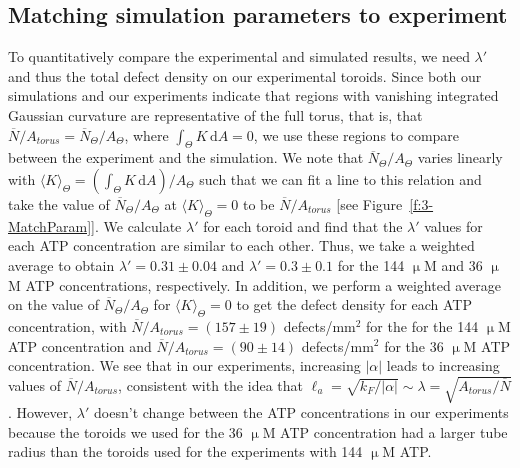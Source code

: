 \subsection{Matching simulation parameters to experiment}
To quantitatively compare the experimental and simulated results, we need $\lambda'$ and thus the total defect density on our experimental toroids.
Since both our simulations and our experiments indicate that regions with vanishing integrated Gaussian curvature are representative of the full torus, that is, that $\overbar{N}/A_{torus} = \overbar{N}_{\Theta}/A_{\Theta}$, where  $\int_{\Theta} K\, \textrm{d}A = 0$, we use these regions to compare between the experiment and the simulation.
We note that $\overbar{N}_{\Theta}/A_{\Theta}$ varies linearly with $\langle K \rangle_{\Theta} = (\int_{\Theta}K\,\textrm{d}A)/A_{\Theta}$ such that we can fit a line to this relation and take the value of $\overbar{N}_{\Theta}/A_{\Theta}$ at $\langle K \rangle_{\Theta} = 0$ to be $\overbar{N}/A_{torus}$ [see Figure~\ref{f:3-MatchParam}].
We calculate $\lambda'$ for each toroid and find that the $\lambda'$ values for each ATP concentration are similar to each other.
Thus, we take a weighted average to obtain $\lambda' = 0.31 \pm 0.04$ and $\lambda' = 0.3 \pm 0.1$ for the 144 $\upmu$M and 36 $\upmu$M ATP concentrations, respectively.
In addition, we perform a weighted average on the value of $\overbar{N}_{\Theta}/A_{\Theta}$ for $\langle K \rangle_{\Theta} = 0$ to get the defect density for each ATP concentration, with $\overbar{N}/A_{torus} = (157 \pm 19)$ defects/mm$^{2}$ for the for the 144 $\upmu$M ATP concentration and $\overbar{N}/A_{torus} = (90 \pm 14)$ defects/mm$^{2}$ for the 36 $\upmu$M ATP concentration.
We see that in our experiments, increasing $|\alpha|$ leads to increasing values of $\overbar{N}/A_{torus}$, consistent with the idea that $\ell_a = \sqrt{k_F / |\alpha|} \sim \lambda = \sqrt{A_{torus}/\overbar{N}}$.
However, $\lambda'$ doesn't change between the ATP concentrations in our experiments because the toroids we used for the 36 $\upmu$M ATP concentration had a larger tube radius than the toroids used for the experiments with 144 $\upmu$M ATP.
